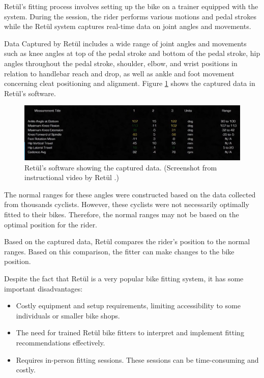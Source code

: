 Retül's fitting process involves setting up the bike on a trainer equipped with the system. During the session, the rider performs various motions and pedal strokes while the Retül system captures real-time data on joint angles and movements.

Data Captured by Retül includes a wide range of joint angles and movements such as knee angles at top of the pedal stroke and bottom of the pedal stroke, hip angles throughout the pedal stroke, shoulder, elbow, and wrist positions in relation to handlebar reach and drop, as well as ankle and foot movement concerning cleat positioning and alignment. Figure \ref{fig:retul_app} shows the captured data in Retül's software.

\begin{figure}[htbp]
    \centering
    \includegraphics[width=\textwidth]{obrazky-figures/retul_app_crop.png}
    \caption{Retül's software showing the captured data. (Screenshot from  instructional video by Retül \cite{retulScreenYoutube}.)}
    \label{fig:retul_app}
\end{figure}

The normal ranges for these angles were constructed based on the data collected from thousands cyclists. However, these cyclists were not necessarily optimally fitted to their bikes. Therefore, the normal ranges may not be based on the optimal position for the rider.

Based on the captured data, Retül compares the rider's position to the normal ranges. Based on this comparison, the fitter can make changes to the bike position.

Despite the fact that Retül is a very popular bike fitting system, it has some important disadvantages:
\begin{itemize}
    \item Costly equipment and setup requirements, limiting accessibility to some individuals or smaller bike shops.
    \item The need for trained Retül bike fitters to interpret and implement fitting recommendations effectively.
    \item Requires in-person fitting sessions. These sessions can be time-consuming and costly.
\end{itemize}


